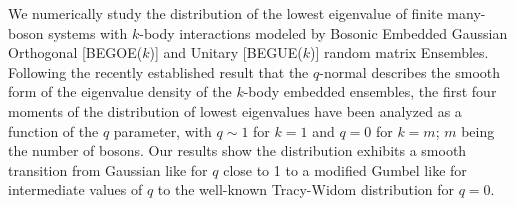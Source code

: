 We numerically study the distribution of the lowest eigenvalue of finite many-boson systems with $k$-body interactions modeled by Bosonic Embedded Gaussian Orthogonal [BEGOE($k$)] and Unitary [BEGUE($k$)] random matrix Ensembles.  Following the recently established result that the $q$-normal  describes the smooth form of the eigenvalue density of the $k$-body embedded ensembles, the first four moments of the distribution of lowest eigenvalues have been analyzed as a function of the $q$ parameter, with $q \sim 1$ for $k = 1$ and $q = 0$ for $k = m$; $m$ being the number of bosons.  Our results show the distribution exhibits a smooth transition from Gaussian like  for $q$ close to 1 to a modified Gumbel like for intermediate values of $q$ to the well-known Tracy-Widom distribution for $q=0$.